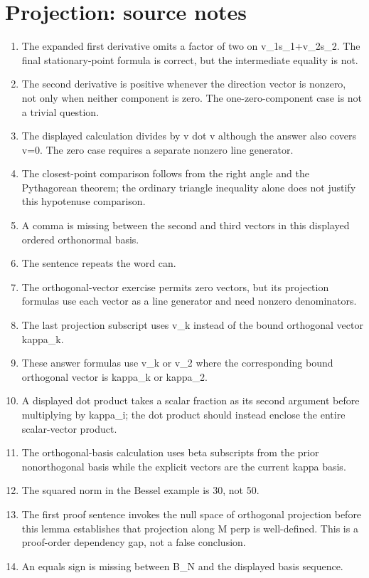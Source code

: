 \section*{Projection: source notes}
\begin{enumerate}
\item The expanded first derivative omits a factor of two on v\_1s\_1+v\_2s\_2. The final stationary-point formula is correct, but the intermediate equality is not.
\item The second derivative is positive whenever the direction vector is nonzero, not only when neither component is zero. The one-zero-component case is not a trivial question.
\item The displayed calculation divides by v dot v although the answer also covers v=0. The zero case requires a separate nonzero line generator.
\item The closest-point comparison follows from the right angle and the Pythagorean theorem; the ordinary triangle inequality alone does not justify this hypotenuse comparison.
\item A comma is missing between the second and third vectors in this displayed ordered orthonormal basis.
\item The sentence repeats the word can.
\item The orthogonal-vector exercise permits zero vectors, but its projection formulas use each vector as a line generator and need nonzero denominators.
\item The last projection subscript uses v\_k instead of the bound orthogonal vector kappa\_k.
\item These answer formulas use v\_k or v\_2 where the corresponding bound orthogonal vector is kappa\_k or kappa\_2.
\item A displayed dot product takes a scalar fraction as its second argument before multiplying by kappa\_i; the dot product should instead enclose the entire scalar-vector product.
\item The orthogonal-basis calculation uses beta subscripts from the prior nonorthogonal basis while the explicit vectors are the current kappa basis.
\item The squared norm in the Bessel example is 30, not 50.
\item The first proof sentence invokes the null space of orthogonal projection before this lemma establishes that projection along M perp is well-defined. This is a proof-order dependency gap, not a false conclusion.
\item An equals sign is missing between B\_N and the displayed basis sequence.

\end{enumerate}
